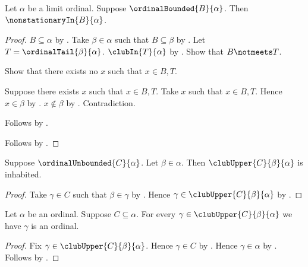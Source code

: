 \begin{proposition}\label{bounded_is_nonstationary}
    Let $\alpha$ be a limit ordinal.
    Suppose $\ordinalBounded{B}{\alpha}$.
    Then $\nonstationaryIn{B}{\alpha}$.
\end{proposition}
\begin{proof}
    $B\subseteq\alpha$ by .
    Take $\beta\in\alpha$ such that $B\subseteq\beta$
        by .
    Let $T=\ordinalTail{\beta}{\alpha}$.
    $\clubIn{T}{\alpha}$ by .
    Show that $B\notmeets T$.
    \begin{subproof}
        Show that there exists no $x$ such that $x\in B,T$.
        \begin{subproof}
            Suppose there exists $x$ such that $x\in B,T$.
            Take $x$ such that $x\in B,T$.
            Hence $x\in\beta$ by .
            $x\notin\beta$ by .
            Contradiction.
        \end{subproof}
        Follows by .
    \end{subproof}
    Follows by .
\end{proof}

\begin{proposition}\label{club_upper_inhabited}
    Suppose $\ordinalUnbounded{C}{\alpha}$.
    Let $\beta\in\alpha$.
    Then $\clubUpper{C}{\beta}{\alpha}$ is inhabited.
\end{proposition}
\begin{proof}
    Take $\gamma\in C$ such that $\beta\in\gamma$
        by .
    Hence $\gamma\in\clubUpper{C}{\beta}{\alpha}$
        by .
\end{proof}

\begin{proposition}\label{club_upper_are_ordinals}
    Let $\alpha$ be an ordinal.
    Suppose $C\subseteq\alpha$.
    For every $\gamma\in\clubUpper{C}{\beta}{\alpha}$ we have
        $\gamma$ is an ordinal.
\end{proposition}
\begin{proof}
    Fix $\gamma\in\clubUpper{C}{\beta}{\alpha}$.
    Hence $\gamma\in C$ by .
    Hence $\gamma\in\alpha$ by .
    Follows by .
\end{proof}


